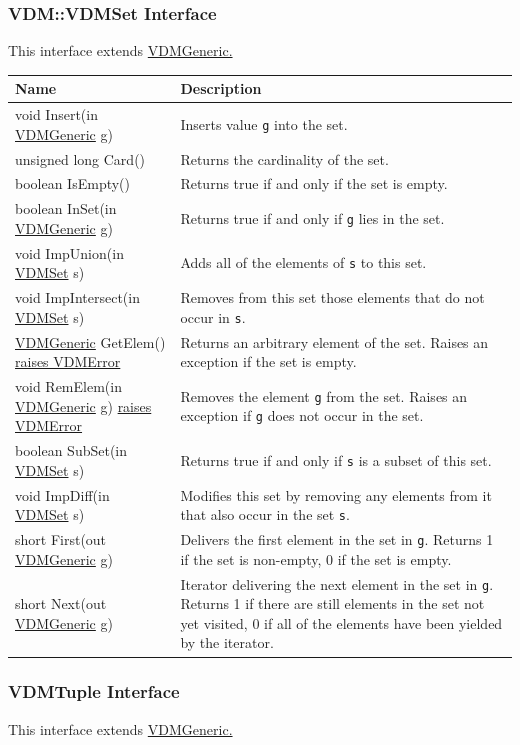 \documentclass[\pformat,12pt]{article}
\newcommand{\pbs}[1]{\let\temp=\\#1\let\\=\temp}
\newenvironment{interfacetable}{%
  \begin{longtable}{|>{\pbs\raggedright\ttfamily}p{6.6cm}%
                    |>{\pbs\raggedright}p{6.6cm}|} \hline
  \textrm{\bfseries Name} &  \textbf{Description} \\ \hline
  \endhead
  }{\end{longtable}}
\newcommand{\VDMError}{\hyperlink{exception.VDMError}{raises VDMError}}
\newcommand{\VDMGeneric}{\hyperlink{interface.Generic}{VDMGeneric}}
\newcommand{\VDMSet}{\hyperlink{interface.VDMSet}{VDMSet}}
\begin{document}
\subsubsection{VDM::VDMSet Interface}
\mbox{}
This interface extends \hyperlink{interface.Generic}{VDMGeneric.}

\begin{interfacetable}
void Insert(in {\VDMGeneric} g)
 & Inserts value \texttt{g} into the set.
\\ \hline
unsigned long Card()
 & Returns the cardinality of the set.
\\ \hline
boolean IsEmpty()
 & Returns true if and only if the set is empty.
\\ \hline
boolean InSet(in {\VDMGeneric} g)
 & Returns true if and only if \texttt{g} lies in the set.
\\ \hline
void ImpUnion(in {\VDMSet} s)
 & Adds all of the elements of \texttt{s} to this set.
\\ \hline
void ImpIntersect(in {\VDMSet} s)
 & Removes from this set those elements that do not occur in
 \texttt{s}. 
\\ \hline
{\VDMGeneric} GetElem() {\VDMError}
 & Returns an arbitrary element of the set. Raises an exception if the
   set is empty.
\\ \hline
void RemElem(in {\VDMGeneric} g) {\VDMError}
 & Removes the element \texttt{g} from the set. Raises an exception if
   \texttt{g} does not occur in the set.
\\ \hline
boolean SubSet(in {\VDMSet} s)
 & Returns true if and only if \texttt{s} is a subset of this set.
\\ \hline
void ImpDiff(in {\VDMSet} s)
 & Modifies this set by removing any elements from it that also occur
 in the set \texttt{s}.
\\ \hline
short First(out {\VDMGeneric} g)
 & Delivers the first element in the set in \texttt{g}.
   Returns 1 if the set is non-empty, 0 if the set is empty. 
\\ \hline
short Next(out {\VDMGeneric} g)
 & Iterator delivering the next element in the set in \texttt{g}.
   Returns 1 if there are still elements in the set not yet visited, 0 if
   all of the elements have been yielded by the iterator.
\\ \hline
\end{interfacetable}

\subsubsection{VDMTuple Interface}
\mbox{}
This interface extends \hyperlink{interface.Generic}{VDMGeneric.}
\end{document}
